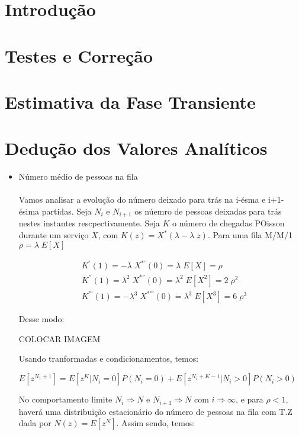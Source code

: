 \documentclass[a4paper]{article}
\begin{document}
\section{Introdução}
\section{Testes e Correção}
\section{Estimativa da Fase Transiente}
\section{Dedução dos Valores Analíticos}
\begin{itemize}
    \item Número médio de pessoas na fila\\\\
    Vamos analisar a evolução do número deixado para trás na i-ésma e i+1-ésima partidas. Seja \(N_i\) e  \(N_{i+1}\) os núemro de pessoas deixadas para trás nestes instantes rescpectivamente. Seja \(K\) o número de chegadas POisson durante um serviço \(X\), com \(K(z) = X^*(\lambda - \lambda\;z)\). Para uma fila M/M/1 \(\rho = \lambda\;E[X]\)
    \begin{center}
         \begin{align*}
            &K^{'}(1) = -\lambda\;X^{*'}(0) = \lambda\; E[X] = \rho\\
            &K^{''}(1) = \lambda^2\;X^{*''}(0) = \lambda^2\; E[X^2] = 2\;\rho^2\\
            &K^{'''}(1) = -\lambda^3\;X^{*'''}(0) = \lambda^3\; E[X^3] = 6\;\rho^3
         \end{align*}
    \end{center}
    Desse modo:
    \begin{center}
        COLOCAR IMAGEM
    \end{center}
    Usando tranformadas e condicionamentos, temos: 
    \begin{center}
        \(E[z^{N_{1}+1}] = E[z^{K}| N_i = 0]P(N_i = 0) + E[z^{N_{i}+K-1} | N_i>0]P(N_i>0)\)
    \end{center}
    No comportamento limite \(N_i \Rightarrow N\) e \(N_{i+1} \Rightarrow N\) com \(i \Rightarrow \infty\), e para \(\rho < 1 \), haverá uma distribuição estacionário do número de pessoas na fila com T.Z dada por \(N(z) = E[z^N]\). Assim sendo, temos:

\end{itemize}
\end{document}
